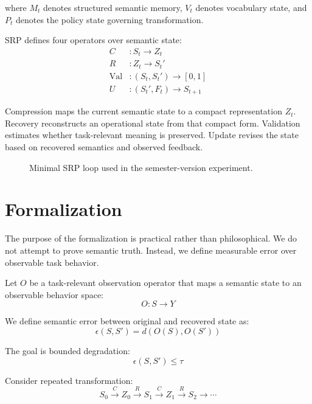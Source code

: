 \documentclass[11pt]{article}
\begin{document}
where $M_t$ denotes structured semantic memory, $V_t$ denotes vocabulary state, and $P_t$ denotes the policy state governing transformation.

SRP defines four operators over semantic state:
\begin{align}
C &: S_t \to Z_t \\
R &: Z_t \to S_t' \\
\mathrm{Val} &: (S_t, S_t') \to [0,1] \\
U &: (S_t', F_t) \to S_{t+1}
\end{align}

Compression maps the current semantic state to a compact representation $Z_t$. Recovery reconstructs an operational state from that compact form. Validation estimates whether task-relevant meaning is preserved. Update revises the state based on recovered semantics and observed feedback.

\begin{figure}[t]
  \centering
  \caption{Minimal SRP loop used in the semester-version experiment.}
  \label{fig:algorithm}
\end{figure}

\section{Formalization}
The purpose of the formalization is practical rather than philosophical. We do not attempt to prove semantic truth. Instead, we define measurable error over observable task behavior.

Let $O$ be a task-relevant observation operator that maps a semantic state to an observable behavior space:
\begin{equation}
O : S \to Y
\end{equation}

We define semantic error between original and recovered state as:
\begin{equation}
\epsilon(S, S') = d(O(S), O(S'))
\end{equation}

The goal is bounded degradation:
\begin{equation}
\epsilon(S, S') \le \tau
\end{equation}

Consider repeated transformation:
\begin{equation}
S_0 \xrightarrow{C} Z_0 \xrightarrow{R} S_1 \xrightarrow{C} Z_1 \xrightarrow{R} S_2 \to \cdots
\end{equation}
\end{document}
